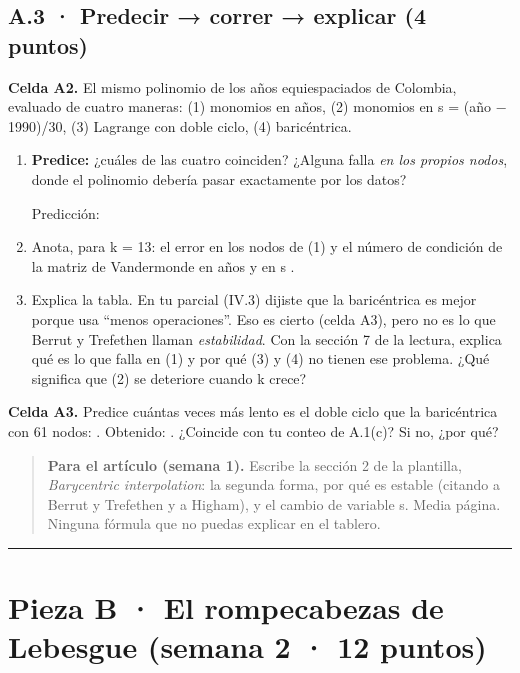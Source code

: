 
\subsection{A.3 · Predecir → correr → explicar (4 puntos)}

\textbf{Celda A2.} El mismo polinomio de los años equiespaciados de Colombia, evaluado de cuatro maneras: (1) monomios en años, (2) monomios en s = (año − 1990)/30, (3) Lagrange con doble ciclo, (4) baricéntrica.

\begin{enumerate}
\def\labelenumi{(\alph{enumi})}
\item \textbf{Predice:} ¿cuáles de las cuatro coinciden? ¿Alguna falla \emph{en los propios nodos}, donde el polinomio debería pasar exactamente por los datos?

Predicción: 

\item Anota, para k = 13: el error en los nodos de (1)  y el número de condición de la matriz de Vandermonde en años  y en s .
\item Explica la tabla. En tu parcial (IV.3) dijiste que la baricéntrica es mejor porque usa ``menos operaciones''. Eso es cierto (celda A3), pero no es lo que Berrut y Trefethen llaman \emph{estabilidad}. Con la sección 7 de la lectura, explica qué es lo que falla en (1) y por qué (3) y (4) no tienen ese problema. ¿Qué significa que (2) se deteriore cuando k crece?
\end{enumerate}


\textbf{Celda A3.} Predice cuántas veces más lento es el doble ciclo que la baricéntrica con 61 nodos: . Obtenido: . ¿Coincide con tu conteo de A.1(c)? Si no, ¿por qué?

\begin{quote}
\textbf{Para el artículo (semana 1).} Escribe la sección 2 de la plantilla, \emph{Barycentric interpolation}: la segunda forma, por qué es estable (citando a Berrut y Trefethen y a Higham), y el cambio de variable s. Media página. Ninguna fórmula que no puedas explicar en el tablero.
\end{quote}

\begin{center}\rule{0.5\linewidth}{0.5pt}\end{center}

\section{Pieza B · El rompecabezas de Lebesgue (semana 2 · 12 puntos)}

